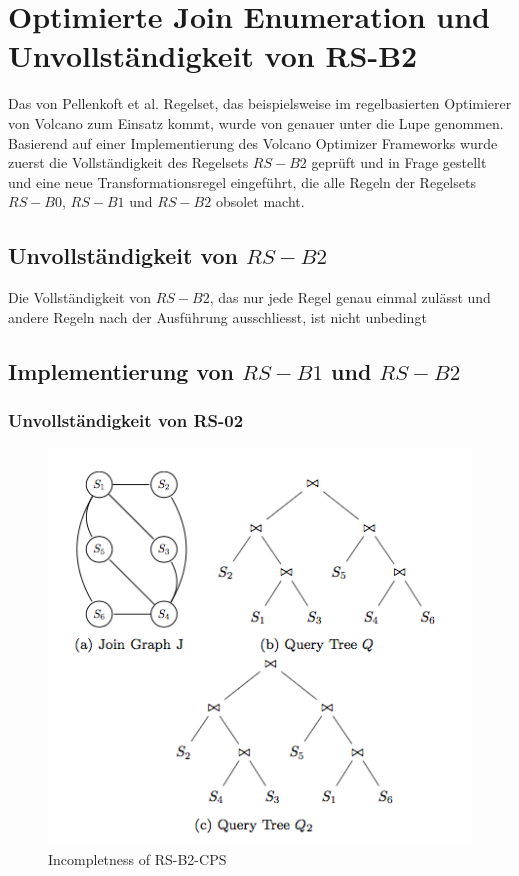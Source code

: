 \section{Optimierte Join Enumeration und Unvollständigkeit von RS-B2}

Das von Pellenkoft et al. Regelset, das beispielsweise im regelbasierten Optimierer von Volcano zum Einsatz kommt, wurde von \cite{shanbhag2014optimizing} genauer unter die Lupe genommen. Basierend auf einer Implementierung des Volcano Optimizer Frameworks wurde zuerst die Vollständigkeit des Regelsets $RS-B2$ geprüft und in Frage gestellt und eine neue Transformationsregel eingeführt, die alle Regeln der Regelsets $RS-B0$, $RS-B1$ und $RS-B2$ obsolet macht.

\subsection{Unvollständigkeit von $RS-B2$}

Die Vollständigkeit von $RS-B2$, das nur jede Regel genau einmal zulässt und andere Regeln nach der Ausführung ausschliesst, ist nicht unbedingt 

\subsection{Implementierung von $RS-B1$ und $RS-B2$}







\subsubsection{Unvollständigkeit von RS-02}


\begin{figure}[h]
  \centering
  \includegraphics[width=\textwidth]{03_Related_Work/Incompleteness_RS-B2-CPS.png}
  \caption{Incompletness of RS-B2-CPS}
  \label{Incompleteness_RS-B2-CPS}
\end{figure}



